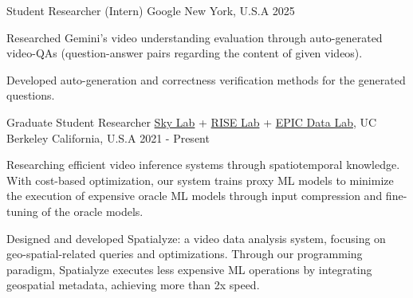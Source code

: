 

\begin{cventries}

  \cvwork
    {Student Researcher (Intern)} %
    {Google} %
    {New York, U.S.A} %
    {2025} %
    {
      \begin{cvitems} %
        \item{Researched Gemini's video understanding evaluation through auto-generated video-QAs (question-answer pairs regarding the content of given videos).}
        \item{Developed auto-generation and correctness verification methods for the generated questions.}
      \end{cvitems}
    }

  \cvwork
    {Graduate Student Researcher} %
    {
        \href{https://sky.cs.berkeley.edu/}{Sky Lab} +
        \href{https://rise.cs.berkeley.edu/}{RISE Lab} +
        \href{https://epic.berkeley.edu/}{EPIC Data Lab}, UC Berkeley
    } %
    {California, U.S.A} %
    {2021 - Present} %
    {
      \begin{cvitems} %
        \item{Researching efficient video inference systems through spatiotemporal knowledge.
        With cost-based optimization, our system trains proxy ML models to minimize the execution of expensive oracle ML models through input compression and fine-tuning of the oracle models.}
        \item{Designed and developed Spatialyze: a video data analysis system, focusing on geo-spatial-related queries and optimizations. Through our programming paradigm, Spatialyze executes less expensive ML operations by integrating geospatial metadata, achieving more than 2x speed.}
      \end{cvitems}
    }


\end{cventries}
